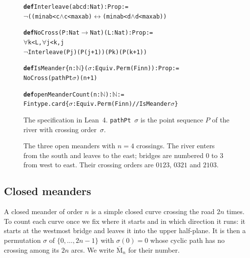 \documentclass[11pt]{amsart}
\newcommand{\kw}[1]{\textbf{#1}}
\newenvironment{leancode}{\par\smallskip\noindent\begin{minipage}{\linewidth}\begin{alltt}\small}{\end{alltt}\end{minipage}\par\smallskip}
\theoremstyle{definition}
\theoremstyle{remark}
\newcommand{\Closed}{\overline{\mathrm{M}}}
\newcommand{\code}[1]{\texttt{#1}}
\begin{document}
\begin{figure}[t]
\begin{leancode}
\kw{def} Interleave (a b c d : Nat) : Prop :=
  \(\neg\) ((min a b < c \(\wedge\) c < max a b) \(\leftrightarrow\) (min a b < d \(\wedge\) d < max a b))

\kw{def} NoCross (P : Nat \(\to\) Nat) (L : Nat) : Prop :=
  \(\forall\) k < L, \(\forall\) j < k, j %
    \(\neg\) Interleave (P j) (P (j + 1)) (P k) (P (k + 1))

\kw{def} IsMeander \{n : \(\mathbb{N}\)\} (\(\sigma\) : Equiv.Perm (Fin n)) : Prop :=
  NoCross (pathPt \(\sigma\)) (n + 1)

\kw{def} openMeanderCount (n : \(\mathbb{N}\)) : \(\mathbb{N}\) :=
  Fintype.card \{\(\sigma\) : Equiv.Perm (Fin n) // IsMeander \(\sigma\)\}
\end{leancode}
\caption{The specification in Lean~4. \code{pathPt}~$\sigma$ is the point sequence $P$ of the river with crossing order~$\sigma$.}\label{fig:spec}
\end{figure}

\begin{figure}[t]
\centering
\hspace{1.2em}\hspace{1.2em}
\caption{The three open meanders with $n=4$ crossings. The river enters from the south and
leaves to the east; bridges are numbered $0$ to $3$ from west to east. Their crossing orders
are $0123$, $0321$ and $2103$.}\label{fig:n4}
\end{figure}

\subsection{Closed meanders}
A closed meander of order $n$ is a simple closed curve crossing the road $2n$ times. To count
each curve once we fix where it starts and in which direction it runs: it starts at the
westmost bridge and leaves it into the upper half-plane. It is then a permutation $\sigma$ of
$\{0,\dots,2n-1\}$ with $\sigma(0)=0$ whose cyclic path has no crossing among its $2n$ arcs.
We write $\Closed_n$ for their number.
\end{document}
